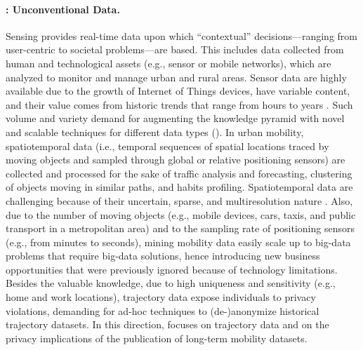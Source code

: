 \paragraph{: Unconventional Data.}
Sensing provides real-time data upon which ``contextual'' decisions---ranging from user-centric to societal problems---are based. This includes data collected from human and technological assets (e.g., sensor or mobile networks), which are analyzed to monitor and manage urban and rural areas. Sensor data are highly available due to the growth of Internet of Things devices, have variable content, and their value comes from historic trends that range from hours to years \cite{kelleher2018data}. Such volume and variety demand for augmenting the knowledge pyramid with novel and scalable techniques for different data types (). In urban mobility, spatiotemporal data (i.e., temporal sequences of spatial locations traced by moving objects and sampled through global or relative positioning sensors) are collected and processed for the sake of traffic analysis and forecasting, clustering of objects moving in similar paths, and habits profiling. Spatiotemporal data are challenging because of their uncertain, sparse, and multiresolution nature \cite{DBLP:journals/cacm/GilPBBBBCEGHHHK19}. Also, due to the number of moving objects (e.g., mobile devices, cars, taxis, and public transport in a metropolitan area) and to the sampling rate of positioning sensors (e.g., from minutes to seconds), mining mobility data easily scale up to big-data problems that require big-data solutions, hence introducing %
new business opportunities
that were previously ignored because of technology limitations. Besides the valuable knowledge, due to high uniqueness \cite{DeMontjoye2013} and sensitivity (e.g., home and work locations), trajectory data expose individuals to privacy violations, demanding for ad-hoc techniques to (de-)anonymize historical trajectory datasets. In this direction,  focuses on trajectory data and on the privacy implications of the publication of long-term mobility datasets.


